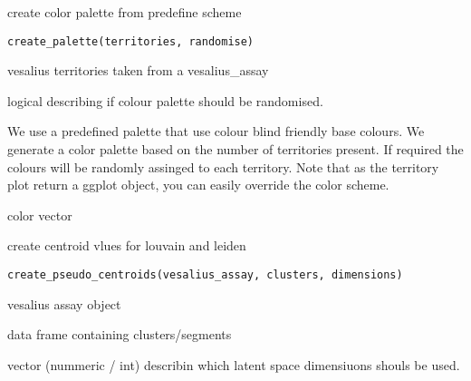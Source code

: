 \documentclass[a4paper]{book}
\begin{document}
%
\begin{Description}
create color palette from predefine scheme
\end{Description}
%
\begin{Usage}
\begin{verbatim}
create_palette(territories, randomise)
\end{verbatim}
\end{Usage}
%
\begin{Arguments}
\begin{ldescription}
\item[\code{territories}] vesalius territories taken from a vesalius\_assay

\item[\code{randomise}] logical describing if colour palette should be 
randomised.
\end{ldescription}
\end{Arguments}
%
\begin{Details}
We use a predefined palette that use colour blind friendly
base colours. We generate a color palette based on the number of 
territories present. If required the colours will be randomly assinged
to each territory. Note that as the territory plot 
return a ggplot object, you can easily override the color scheme.
\end{Details}
%
\begin{Value}
color vector
\end{Value}
%
\begin{Description}
create centroid vlues for louvain and leiden
\end{Description}
%
\begin{Usage}
\begin{verbatim}
create_pseudo_centroids(vesalius_assay, clusters, dimensions)
\end{verbatim}
\end{Usage}
%
\begin{Arguments}
\begin{ldescription}
\item[\code{vesalius\_assay}] vesalius assay object

\item[\code{clusters}] data frame containing clusters/segments

\item[\code{dimensions}] vector (nummeric / int) describin which latent space
dimensiuons shouls be used.
\end{ldescription}
\end{Arguments}
\end{document}
